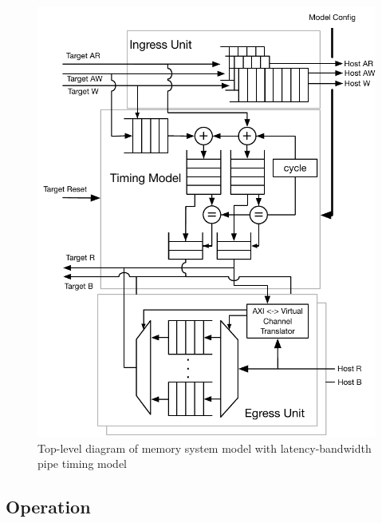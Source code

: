 \begin{figure}
	\centering
	\includegraphics[width=\columnwidth]{figures/memory-model-block-diagram.pdf}
	\caption{Top-level diagram of memory system model with latency-bandwidth pipe timing model}
	\label{fig:timing_model}
\end{figure}

\subsection{Operation}


